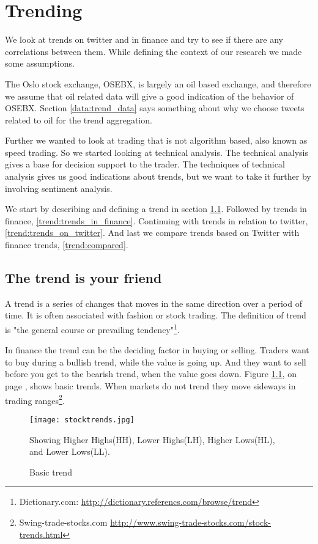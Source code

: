 \chapter{Trending}\label{trend}

We look at trends on twitter and in finance and try to see if there are any
correlations between them. While defining the context of our research we made
some assumptions.

The Oslo stock exchange, OSEBX, is largely an oil based exchange, and
therefore we assume that oil related data will give a good indication of the
behavior of OSEBX. Section \ref{data:trend_data} says something about why we
choose tweets related to oil for the trend aggregation.

Further we wanted to look at trading that is not algorithm based, also
known as speed trading. So we started looking at technical analysis. The
technical analysis gives a base for decision support to the trader. The
techniques of technical analysis gives us good indications about trends, but we
want to take it further by involving sentiment analysis. 

We start by describing and defining a trend in section
\ref{trend:trend_is_your_friend}. 
Followed by trends in finance, \ref{trend:trends_in_finance}. 
Continuing with trends in relation to twitter, \ref{trend:trends_on_twitter}. 
And last we compare trends based on Twitter with finance trends, \ref{trend:compared}.
%

\section{The trend is your friend}\label{trend:trend_is_your_friend}
A trend is a series of changes that moves in the same direction over a period
of time. It is often associated with fashion or stock trading. The
definition of trend is "the general course or prevailing
tendency"\footnote{Dictionary.com:
\url{http://dictionary.referencs.com/browse/trend}}.

In finance the trend can be the deciding factor in buying or selling. Traders want
to buy during a bullish trend, while the value is going up. And they 
want to sell before you get to the bearish trend, when the value goes down.
Figure \ref{fig:stocktrends}, on page \pageref{fig:stocktrends}, shows basic
trends. When markets do not trend they move
sideways in trading ranges\footnote{Swing-trade-stocks.com
\url{http://www.swing-trade-stocks.com/stock-trends.html}}.   

\begin{figure}[htb]
    \centering
    \texttt{[image: stocktrends.jpg]} 
    \label{fig:stocktrends}
    \caption{Basic trend}
Showing Higher Highs(HH), Lower Highs(LH), Higher Lows(HL), and Lower Lows(LL). 
\end{figure}

